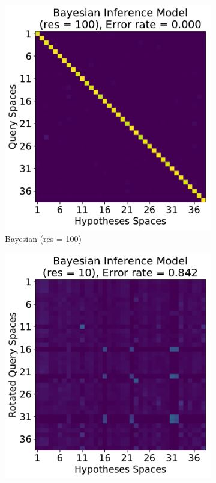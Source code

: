 \begin{figure}[t!]
 	\begin{subfigure}[]{0.235\textwidth}
		\includegraphics[width=\textwidth]{figures/plots/heatmap-b100}
		\caption{Bayesian (res = 100)}
			\label{fig:100-heatmap}
	\end{subfigure}
	\begin{subfigure}[]{0.235\textwidth}
		\includegraphics[width=\textwidth]{figures/plots/heatmap-b10}

\end{subfigure}
\end{figure}
